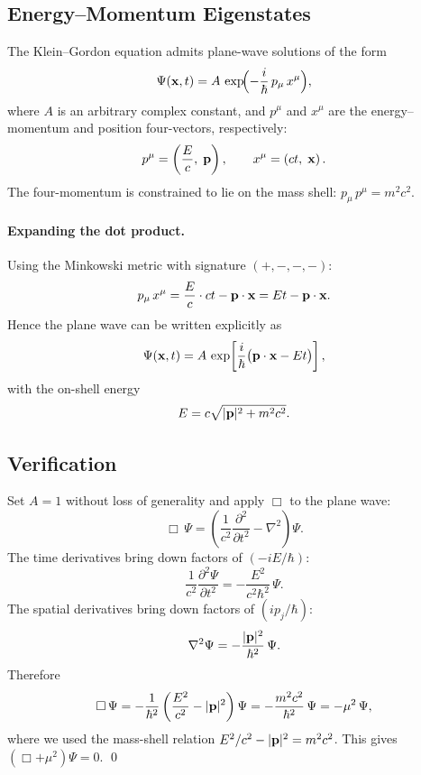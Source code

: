 \documentclass[12pt, a4paper]{article}
\theoremstyle{definition}
\begin{document}
\subsection{Energy--Momentum Eigenstates}

The Klein--Gordon equation admits plane-wave solutions of the form
\begin{equation}\label{eq:plane-wave-4vec}
    \Psi(\vb{x},t)
    = A\,\exp\!\Bigl(-\frac{i}{\hbar}\,p_{\mu}\,x^{\mu}\Bigr),
\end{equation}
where $A$ is an arbitrary complex constant, and $p^{\mu}$ and $x^{\mu}$ are
the energy--momentum and position four-vectors, respectively:
\begin{equation}
    p^{\mu} = \left(\frac{E}{c},\;\vb{p}\right),
    \qquad
    x^{\mu} = \left(ct,\;\vb{x}\right).
\end{equation}
The four-momentum is constrained to lie on the mass shell:
$p_{\mu}\,p^{\mu} = m^{2}c^{2}$.

\paragraph{Expanding the dot product.}
Using the Minkowski metric with signature $(+,-,-,-)$:
\begin{equation}
    p_{\mu}\,x^{\mu}
    = \frac{E}{c}\cdot ct - \vb{p}\cdot\vb{x}
    = Et - \vb{p}\cdot\vb{x}.
\end{equation}
Hence the plane wave can be written explicitly as
\begin{equation}\label{eq:plane-wave-explicit}
    \Psi(\vb{x},t)
    = A\,\exp\!\left[\frac{i}{\hbar}
      \bigl(\vb{p}\cdot\vb{x} - Et\bigr)\right],
\end{equation}
with the on-shell energy
\begin{equation}\label{eq:energy-on-shell}
    E = c\sqrt{|\vb{p}|^{2} + m^{2}c^{2}}.
\end{equation}

\subsection{Verification}

\begin{derivation}
Set $A=1$ without loss of generality and apply $\Box$ to the plane wave:
\[
    \Box\,\Psi
    = \left(\frac{1}{c^{2}}\frac{\partial^{2}}{\partial t^{2}}
      - \nabla^{2}\right)\Psi.
\]
The time derivatives bring down factors of $(-iE/\hbar)$:
\[
    \frac{1}{c^{2}}\frac{\partial^{2}\Psi}{\partial t^{2}}
    = -\frac{E^{2}}{c^{2}\hbar^{2}}\,\Psi.
\]
The spatial derivatives bring down factors of $(ip_{j}/\hbar)$:
\[
    \nabla^{2}\Psi
    = -\frac{|\vb{p}|^{2}}{\hbar^{2}}\,\Psi.
\]
Therefore
\[
    \Box\,\Psi
    = -\frac{1}{\hbar^{2}}
      \left(\frac{E^{2}}{c^{2}} - |\vb{p}|^{2}\right)\Psi
    = -\frac{m^{2}c^{2}}{\hbar^{2}}\,\Psi
    = -\mu^{2}\,\Psi,
\]
where we used the mass-shell relation $E^{2}/c^{2} - |\vb{p}|^{2} = m^{2}c^{2}$.
This gives $(\Box + \mu^{2})\Psi = 0$.  \qed
\end{derivation}
\end{document}
